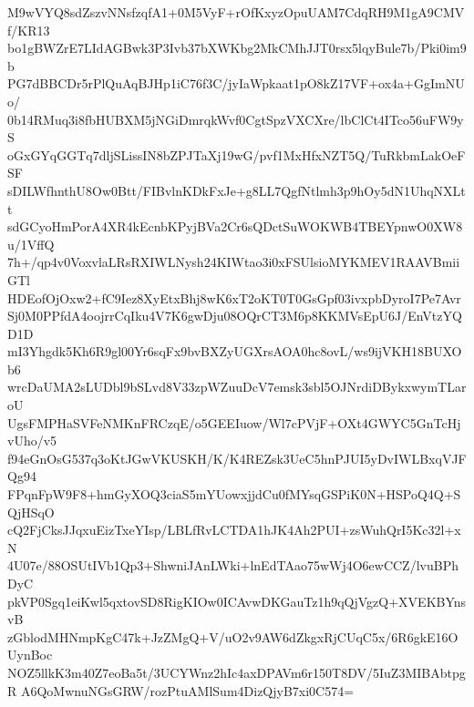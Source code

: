 M9wVYQ8sdZszvNNsfzqfA1+0M5VyF+rOfKxyzOpuUAM7CdqRH9M1gA9CMVf/KR13
bo1gBWZrE7LIdAGBwk3P3Ivb37bXWKbg2MkCMhJJT0rsx5lqyBule7b/Pki0im9b
PG7dBBCDr5rPlQuAqBJHp1iC76f3C/jyIaWpkaat1pO8kZ17VF+ox4a+GgImNUo/
0b14RMuq3i8fbHUBXM5jNGiDmrqkWvf0CgtSpzVXCXre/lbClCt4ITco56uFW9yS
oGxGYqGGTq7dljSLissIN8bZPJTaXj19wG/pvf1MxHfxNZT5Q/TuRkbmLakOeFSF
sDILWfhnthU8Ow0Btt/FIBvlnKDkFxJe+g8LL7QgfNtlmh3p9hOy5dN1UhqNXLtt
sdGCyoHmPorA4XR4kEcnbKPyjBVa2Cr6sQDctSuWOKWB4TBEYpnwO0XW8u/1VffQ
7h+/qp4v0VoxvlaLRsRXIWLNysh24KIWtao3i0xFSUlsioMYKMEV1RAAVBmiiGTl
HDEofOjOxw2+fC9Iez8XyEtxBhj8wK6xT2oKT0T0GsGpf03ivxpbDyroI7Pe7Avr
Sj0M0PPfdA4oojrrCqIku4V7K6gwDju08OQrCT3M6p8KKMVsEpU6J/EnVtzYQD1D
mI3Yhgdk5Kh6R9gl00Yr6sqFx9bvBXZyUGXrsAOA0hc8ovL/ws9ijVKH18BUXOb6
wrcDaUMA2sLUDbl9bSLvd8V33zpWZuuDcV7emsk3sbl5OJNrdiDBykxwymTLaroU
UgsFMPHaSVFeNMKnFRCzqE/o5GEEIuow/Wl7cPVjF+OXt4GWYC5GnTcHjvUho/v5
f94eGnOsG537q3oKtJGwVKUSKH/K/K4REZsk3UeC5hnPJUI5yDvIWLBxqVJFQg94
FPqnFpW9F8+hmGyXOQ3ciaS5mYUowxjjdCu0fMYsqGSPiK0N+HSPoQ4Q+SQjHSqO
cQ2FjCksJJqxuEizTxeYIsp/LBLfRvLCTDA1hJK4Ah2PUI+zsWuhQrI5Kc32l+xN
4U07e/88OSUtIVb1Qp3+ShwniJAnLWki+lnEdTAao75wWj4O6ewCCZ/lvuBPhDyC
pkVP0Sgq1eiKwl5qxtovSD8RigKIOw0ICAvwDKGauTz1h9qQjVgzQ+XVEKBYnsvB
zGblodMHNmpKgC47k+JzZMgQ+V/uO2v9AW6dZkgxRjCUqC5x/6R6gkE16OUynBoc
NOZ5llkK3m40Z7eoBa5t/3UCYWnz2hIc4axDPAVm6r150T8DV/5IuZ3MIBAbtpgR
A6QoMwnuNGsGRW/rozPtuAMlSum4DizQjyB7xi0C574=
